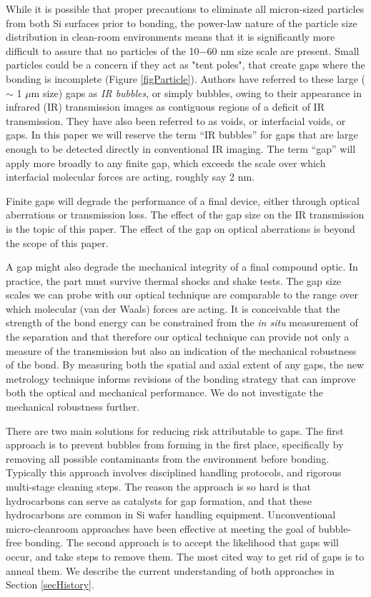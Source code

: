 \documentclass[osajnl,preprint,showpacs,superscriptaddress,12pt]{revtex4-1} %
\begin{document}
While it is possible that proper precautions to eliminate all micron-sized particles from both Si surfaces prior to bonding, the power-law nature of the particle size distribution in clean-room environments \cite{doi:10.1080/02786828608959094} means that it is significantly more difficult to assure that no particles of the 10$-$60 nm size scale are present.  Small particles could be a concern if they act as "tent poles", that create gaps where the bonding is incomplete (Figure \ref{figParticle}).  Authors have referred to these large ($\sim$ 1 $\mu$m size) gaps as \emph{IR bubbles}, or simply bubbles, owing to their appearance in infrared (IR) transmission images as contiguous regions of a deficit of IR transmission.  They have also been referred to as voids, or interfacial voids, or gaps.  In this paper we will reserve the term ``IR bubbles'' for gaps that are large enough to be detected directly in conventional IR imaging.  The term ``gap'' will apply more broadly to any finite gap, which exceeds the scale over which interfacial molecular forces are acting, roughly say 2 nm.  

Finite gaps will degrade the performance of a final device, either through optical aberrations or transmission loss.  The effect of the gap size on the IR transmission is the topic of this paper.  The effect of the gap on optical aberrations is beyond the scope of this paper.  

A gap might also degrade the mechanical integrity of a final compound optic.  In practice, the part must survive thermal shocks and shake tests.  The gap size scales we can probe with our optical technique are comparable to the range over which molecular (van der Waals) forces are acting.  It is conceivable that the strength of the bond energy can be constrained from the \emph{in situ} measurement of the separation and that therefore our optical technique can provide not only a measure of the transmission but also an indication of the mechanical robustness of the bond.  By measuring both the spatial and axial extent of any gaps, the new metrology technique informs revisions of the bonding strategy that can improve both the optical and mechanical performance.  We do not investigate the mechanical robustness further.  

There are two main solutions for reducing risk attributable to gaps.  The first approach is to prevent bubbles from forming in the first place, specifically by removing all possible contaminants from the environment before bonding.  Typically this approach involves disciplined handling protocols, and rigorous multi-stage cleaning steps.  The reason the approach is so hard is that hydrocarbons can serve as catalysts for gap formation\cite{1991JaJAP..30..615M}, and that these hydrocarbons are common in Si wafer handling equipment.  Unconventional micro-cleanroom approaches have been effective at meeting the goal of bubble-free bonding\cite{1989JaJAP..28L2141L}.  The second approach is to accept the likelihood that gaps will occur, and take steps to remove them.  The most cited way to get rid of gaps is to anneal them\cite{Mitani1990}.  We describe the current understanding of both approaches in Section \ref{secHistory}.
\end{document}
